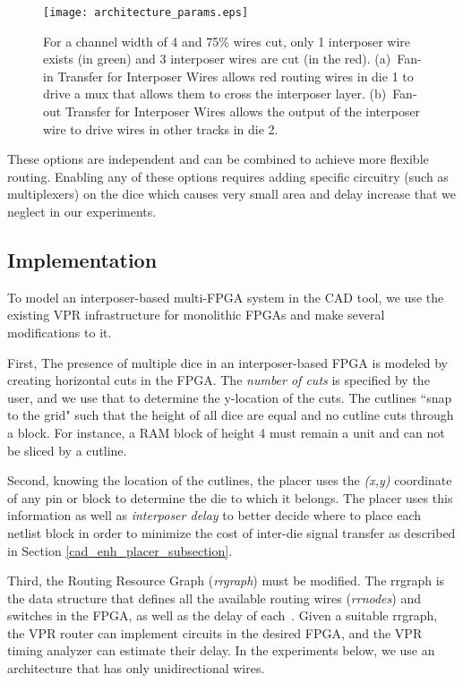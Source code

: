 \documentclass{sig-alternate-2013}
\begin{document}
\begin{figure}[!htbp]
\centering
\texttt{[image: architecture\_params.eps]}
\caption{For a channel width of 4 and 75\% wires cut, only 1 interposer wire exists (in green) and 3 interposer wires are cut (in the red). (a)~Fan-in Transfer for Interposer Wires allows red routing wires in die 1  to drive a mux that allows them to cross the interposer layer. (b)~Fan-out Transfer for Interposer Wires allows the output of the interposer wire to drive wires in other tracks in die 2.}
\label{fig:architecture_params}
\end{figure}

These options are independent and can be combined to achieve more flexible routing. Enabling any of these options requires adding specific circuitry (such as multiplexers) on the dice which causes very small area and delay increase that we neglect in our experiments.

\subsection{Implementation}
To model an interposer-based multi-FPGA system in the CAD tool, we use the existing VPR infrastructure for monolithic FPGAs and make several modifications to it.

First, The presence of multiple dice in an interposer-based FPGA is modeled by creating horizontal cuts in the FPGA. The \textit{number of cuts} is specified by the user, and we use that to determine the y-location of the cuts. The cutlines ``snap to the grid" such that the height of all dice are equal and no cutline cuts through a block. For instance, a RAM block of height 4 must remain a unit and can not be sliced by a cutline.

Second, knowing the location of the cutlines, the placer uses the \textit{(x,y)} coordinate of any pin or block to determine the die to which it belongs. The placer uses this information as well as \textit{interposer delay} to better decide where to place each netlist block in order to minimize the cost of inter-die signal transfer as described in Section \ref{cad_enh_placer_subsection}.

Third, the Routing Resource Graph (\textit{rrgraph}) must be modified. The rrgraph is the data structure that defines all the available routing wires (\textit{rrnodes}) and switches in the FPGA, as well as the delay of each~\cite{betz1999architecture}. Given a suitable rrgraph, the VPR router can implement circuits in the desired FPGA, and the VPR timing analyzer can estimate their delay. In the experiments below, we use an architecture that has only unidirectional wires.
\end{document}
